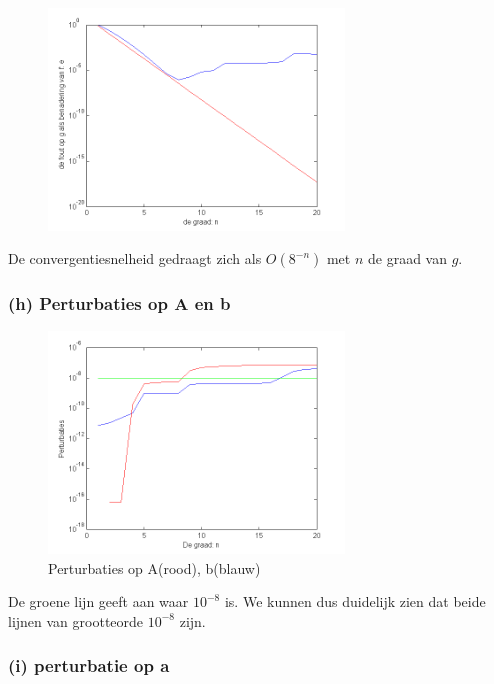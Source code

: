\documentclass[11pt,a4paper]{article}
\begin{document}
\begin{figure}[H]
	\centering
	\vspace{-20pt}
	\includegraphics[width=0.7\textwidth]{22f1.png}
	\vspace{-10pt}
	\end{figure}
De convergentiesnelheid gedraagt zich als $O(8^{-n})$ met $n$ de graad van $g$.
\subsubsection*{(h) Perturbaties op A en b}

\begin{figure}[H]
	\centering
	\vspace{-20pt}
	\includegraphics[width=0.7\textwidth]{22h1.png}
	\caption*{Perturbaties op A(rood), b(blauw)}
	\end{figure}

De groene lijn geeft aan waar $10^{-8}$ is. We kunnen dus duidelijk zien dat beide lijnen van grootteorde $10^{-8}$ zijn.

\subsubsection*{(i) perturbatie op a}
\end{document}
